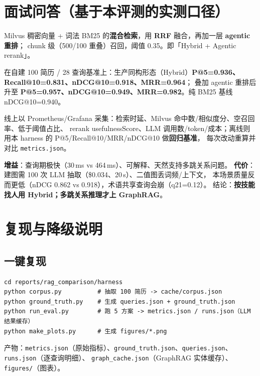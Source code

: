 \documentclass[11pt,a4paper,fontset=windows]{ctexart}
\begin{document}
\section{面试问答（基于本评测的实测口径）}
\label{sec:qa}
\begin{description}[style=nextline,itemsep=7pt,leftmargin=1.2em]
\item[Q1：你的 RAG 是什么形态？]
   Milvus 稠密向量 + 词法 BM25 的\textbf{混合检索}，用 \textbf{RRF} 融合，再加一层\textbf{ agentic 重排}；
   chunk 级（500/100 重叠）召回，阈值 0.35。即「Hybrid + Agentic rerank」。
\item[Q2：准确率/召回率多少？]
   在自建 100 简历 / 28 查询基准上：生产同构形态（Hybrid）\textbf{P@5=0.936、Recall@10=0.831、nDCG@10=0.918、MRR=0.964}；
   叠加 agentic 重排后升至 \textbf{P@5=0.957、nDCG@10=0.949、MRR=0.982}。纯 BM25 基线 nDCG@10=0.940。
\item[Q3：怎么监控？]
   线上以 Prometheus/Grafana 采集：检索时延、Milvus 命中数/相似度分、空召回率、低于阈值占比、
   rerank usefulnessScore、LLM 调用数/token/成本；离线则用本 harness 的 P@5/Recall@10/MRR/nDCG@10 做\textbf{回归基准}，
   每次改动重算并对比 \texttt{metrics.json}。
\item[Q4：GraphRAG 相比 Hybrid 的增益与代价？]
   \textbf{增益}：查询期极快（30\,ms vs 464\,ms）、可解释、天然支持多跳关系问题。
   \textbf{代价}：建图需 100 次 LLM 抽取（\$0.034、20\,s）、二值图丢词频/上下文，
   本场景质量反而更低（nDCG 0.862 vs 0.918），术语共享查询会崩（q21=0.12）。
   结论：\textbf{按技能找人用 Hybrid；多跳关系推理才上 GraphRAG}。
\end{description}

\section{复现与降级说明}
\label{sec:repro}
\subsection{一键复现}
\begin{verbatim}
cd reports/rag_comparison/harness
python corpus.py          # 抽取 100 简历 -> cache/corpus.json
python ground_truth.py    # 生成 queries.json + ground_truth.json
python run_eval.py        # 跑 5 方案 -> metrics.json / runs.json（LLM 结果缓存）
python make_plots.py      # 生成 figures/*.png
\end{verbatim}
产物：\texttt{metrics.json}（原始指标）、\texttt{ground\_truth.json}、\texttt{queries.json}、\texttt{runs.json}（逐查询明细）、
\texttt{graph\_cache.json}（GraphRAG 实体缓存）、\texttt{figures/}（图表）。
\end{document}
